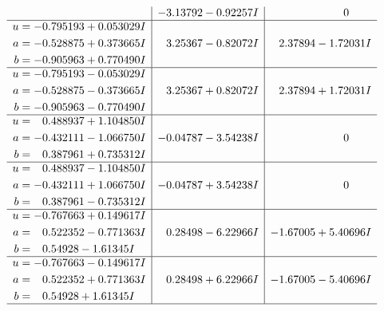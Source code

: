 \documentclass[1p]{elsarticle_modified}
\theoremstyle{definition}
\begin{document}
$$\begin{array}{c|c|c}
 & -3.13792 - 0.92257 I & \phantom{-0.000000 } 0 \\ \hline\begin{aligned}
u &= -0.795193 + 0.053029 I \\
a &= -0.528875 + 0.373665 I \\
b &= -0.905963 + 0.770490 I\end{aligned}
 & \phantom{-}3.25367 - 0.82072 I & \phantom{-}2.37894 - 1.72031 I \\ \hline\begin{aligned}
u &= -0.795193 - 0.053029 I \\
a &= -0.528875 - 0.373665 I \\
b &= -0.905963 - 0.770490 I\end{aligned}
 & \phantom{-}3.25367 + 0.82072 I & \phantom{-}2.37894 + 1.72031 I \\ \hline\begin{aligned}
u &= \phantom{-}0.488937 + 1.104850 I \\
a &= -0.432111 - 1.066750 I \\
b &= \phantom{-}0.387961 + 0.735312 I\end{aligned}
 & -0.04787 - 3.54238 I & \phantom{-0.000000 } 0 \\ \hline\begin{aligned}
u &= \phantom{-}0.488937 - 1.104850 I \\
a &= -0.432111 + 1.066750 I \\
b &= \phantom{-}0.387961 - 0.735312 I\end{aligned}
 & -0.04787 + 3.54238 I & \phantom{-0.000000 } 0 \\ \hline\begin{aligned}
u &= -0.767663 + 0.149617 I \\
a &= \phantom{-}0.522352 - 0.771363 I \\
b &= \phantom{-}0.54928 - 1.61345 I\end{aligned}
 & \phantom{-}0.28498 - 6.22966 I & -1.67005 + 5.40696 I \\ \hline\begin{aligned}
u &= -0.767663 - 0.149617 I \\
a &= \phantom{-}0.522352 + 0.771363 I \\
b &= \phantom{-}0.54928 + 1.61345 I\end{aligned}
 & \phantom{-}0.28498 + 6.22966 I & -1.67005 - 5.40696 I\\
 \hline 
 \end{array}$$\newpage$$\begin{array}{c|c|c}  

\end{array}$$
\end{document}
